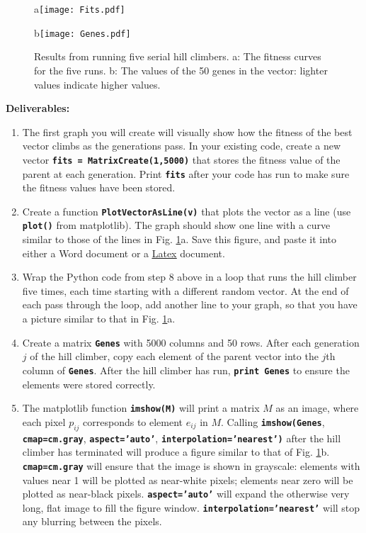 \documentclass[12pt]{article}
\begin{document}
\begin{figure}[!t]
\centerline{a\texttt{[image: Fits.pdf]}}
\centerline{b\texttt{[image: Genes.pdf]}}
\caption{Results from running five serial hill climbers.
a: The fitness curves for the five runs.
b: The values of the 50 genes in the vector: lighter values indicate higher values.}
\label{Fig}
\end{figure}

\noindent \textbf{Deliverables:}

\begin{enumerate}

\item The first graph you will create will visually show how the fitness of the best vector climbs as the generations pass. In your existing code, create a new vector \textbf{\texttt{fits = MatrixCreate(1,5000)}} that stores the fitness value of the parent at each generation. Print \textbf{\texttt{fits}} after your code has run to make sure the fitness values have been stored.

\item Create a function \textbf{\texttt{PlotVectorAsLine(v)}} that plots the vector as a line (use \textbf{\texttt{plot()}} from matplotlib). The graph should show one line with a curve similar to those of the lines in Fig. \ref{Fig}a. Save this figure, and paste it into either a Word document or a \href{http://www.latex-project.org/}{\underline{Latex}} document.

\item Wrap the Python code from step 8 above in a loop that runs the hill climber five times, each time starting with a different random vector. At the end of each pass through the loop, add another line to your graph, so that you have a picture similar to that in Fig. \ref{Fig}a.

\item Create a matrix \textbf{\texttt{Genes}} with 5000 columns and 50 rows. After each generation $j$ of the hill climber, copy each element of the parent vector into the $j$th column of \textbf{\texttt{Genes}}. After the hill climber has run, \textbf{\texttt{print Genes}} to ensure the elements were stored correctly.

\item The matplotlib function \textbf{\texttt{imshow(M)}} will print a matrix $M$ as an image, where each pixel $p_{ij}$ corresponds to element $e_{ij}$ in $M$. Calling \textbf{\texttt{imshow(Genes}}, \textbf{\texttt{cmap=cm.gray}}, \textbf{\texttt{aspect='auto'}}, \textbf{\texttt{interpolation='nearest')}} after the hill climber has terminated will produce a figure similar to that of Fig. \ref{Fig}b. \textbf{\texttt{cmap=cm.gray}} will ensure that the image is shown in grayscale: elements with values near 1 will be plotted as near-white pixels; elements near zero will be plotted as near-black pixels. \textbf{\texttt{aspect='auto'}} will expand the otherwise very long, flat image to fill the figure window. \textbf{\texttt{interpolation='nearest'}} will stop any blurring between the pixels.


\end{enumerate}
\end{document}
